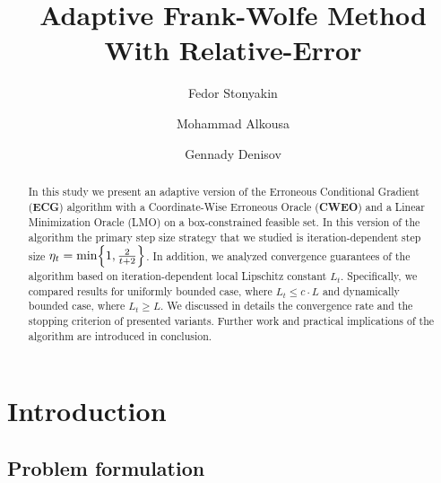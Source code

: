 \documentclass[runningheads, final]{llncs}
\begin{document}
%
\title{Adaptive Frank-Wolfe Method With Relative-Error }
%
%
\author{Fedor Stonyakin \and
    Mohammad Alkousa \and
    Gennady Denisov}
%
%
%
\maketitle              %
%
\begin{abstract}
    In this study we present an adaptive version of the Erroneous
    Conditional Gradient (\textbf{ECG}) algorithm with a Coordinate-Wise
    Erroneous Oracle (\textbf{CWEO}) and a Linear Minimization Oracle (LMO) on
    a box-constrained feasible set. In this version of the algorithm the primary
    step size strategy that we studied is iteration-dependent step size
    $\eta_t = \min\Bigl\{1, \frac{2}{t + 2}\Bigr\}$. In addition, we analyzed
    convergence guarantees of the algorithm based on iteration-dependent local
    Lipschitz constant $L_t$. Specifically, we compared results for uniformly
    bounded case, where $L_t \leqslant c \cdot L$ and dynamically bounded case,
    where $L_t \geqslant L$. We discussed in details the convergence rate and
    the stopping criterion of presented variants. Further work and practical
    implications of the algorithm are introduced in conclusion.

\end{abstract}
%
%
%
\section{Introduction}
\subsection{Problem formulation}
\end{document}
